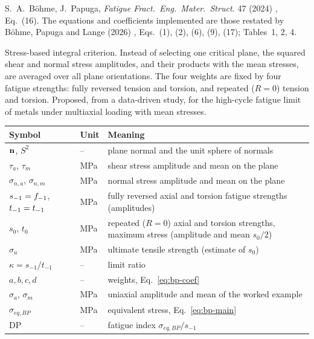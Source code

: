 \label{sheet:BP}

 S.~A.~B\"ohme, J.~Papuga, \emph{Fatigue Fract.\ Eng.\ Mater.\ Struct.} 47 (2024)
\cite{bohme2024}, Eq.~(16). The equations and coefficients implemented are those restated by
B\"ohme, Papuga and Lange (2026) \cite{bohme2026}, Eqs.~(1), (2), (6), (9), (17); Tables~1, 2, 4.

 Stress-based integral criterion. Instead of selecting one critical plane, the
squared shear and normal stress amplitudes, and their products with the mean stresses, are averaged
over all plane orientations. The four weights are fixed by four fatigue strengths: fully reversed
tension and torsion, and repeated ($R=0$) tension and torsion. Proposed, from a data-driven study,
for the high-cycle fatigue limit of metals under multiaxial loading with mean stresses.

\begin{center}\small
\begin{tabular}{@{}llp{100mm}@{}}
\toprule
Symbol & Unit & Meaning\\\midrule
$\mathbf n$, $S^2$ & -- & plane normal and the unit sphere of normals\\
$\tau_a$, $\tau_m$ & MPa & shear stress amplitude and mean on the plane\\
$\sigma_{n,a}$, $\sigma_{n,m}$ & MPa & normal stress amplitude and mean on the plane\\
$s_{-1}=f_{-1}$, $t_{-1}=t_{-1}$ & MPa & fully reversed axial and torsion fatigue strengths (amplitudes)\\
$s_0$, $t_0$ & MPa & repeated ($R=0$) axial and torsion strengths, maximum stress (amplitude and mean $s_0/2$)\\
$\sigma_u$ & MPa & ultimate tensile strength (estimate of $s_0$)\\
$\kappa=s_{-1}/t_{-1}$ & -- & limit ratio\\
$a,b,c,d$ & -- & weights, Eq.~\eqref{eq:bp-coef}\\
$\sigma_a$, $\sigma_m$ & MPa & uniaxial amplitude and mean of the worked example\\
$\sigma_{eq,BP}$ & MPa & equivalent stress, Eq.~\eqref{eq:bp-main}\\
$\mathrm{DP}$ & -- & fatigue index $\sigma_{eq,BP}/s_{-1}$\\
\bottomrule
\end{tabular}
\end{center}

